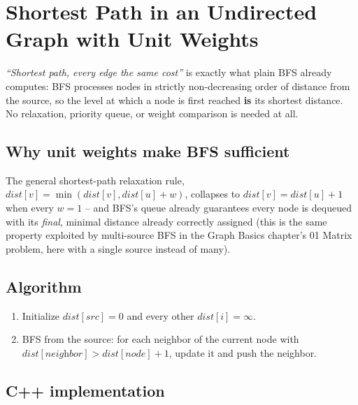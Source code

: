 \section{Shortest Path in an Undirected Graph with Unit Weights}
\label{sec:graph-shortest-path-unit-weights}


\begin{patternbox}
\emph{``Shortest path, every edge the same cost''} is exactly what
plain BFS already computes: BFS processes nodes in strictly
non-decreasing order of distance from the source, so the level at which
a node is first reached \textbf{is} its shortest distance. No
relaxation, priority queue, or weight comparison is needed at all.
\end{patternbox}

\subsection*{Why unit weights make BFS sufficient}

The general shortest-path relaxation rule,
$\textit{dist}[v] = \min(\textit{dist}[v], \textit{dist}[u]+w)$,
collapses to $\textit{dist}[v] = \textit{dist}[u]+1$ when every $w=1$ --
and BFS's queue already guarantees every node is dequeued with its
\emph{final}, minimal distance already correctly assigned (this is the
same property exploited by multi-source BFS in the Graph Basics
chapter's 01 Matrix problem, here with a single source instead of
many).

\subsection*{Algorithm}

\begin{enumerate}
  \item Initialize $\textit{dist}[\textit{src}]=0$ and every other
        $\textit{dist}[i]=\infty$.
  \item BFS from the source: for each neighbor of the current node
        with $\textit{dist}[\textit{neighbor}] > \textit{dist}[\textit{node}]+1$,
        update it and push the neighbor.
\end{enumerate}

\subsection*{C++ implementation}

